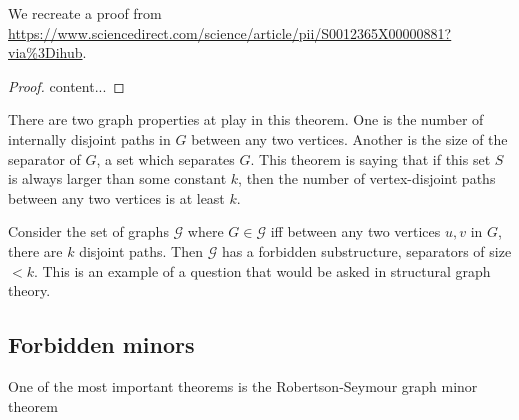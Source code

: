 \documentclass[]{article}
\theoremstyle{definition}
\numberwithin{theorem}{section}
\numberwithin{equation}{section}
\begin{document}
We recreate a proof from \url{https://www.sciencedirect.com/science/article/pii/S0012365X00000881?via%3Dihub}.
\begin{proof}
	content...
\end{proof}
There are two graph properties at play in this theorem. One is the number of internally disjoint paths in $G$ between any two vertices. Another is the size of the separator of $G$, a set which separates $G$. This theorem is saying that if this set $S$ is always larger than some constant $k$, then the number of vertex-disjoint paths between any two vertices is at least $k$. 

Consider the set of graphs $\mathcal{G}$ where $G \in \mathcal{G}$ iff between any two vertices $u, v$ in $G$, there are $k$ disjoint paths. Then $\mathcal{G}$ has a forbidden substructure, separators of size $< k$. This is an example of a question that would be asked in structural graph theory.

\subsection{Forbidden minors}
One of the most important theorems is the Robertson-Seymour graph minor theorem
\end{document}
